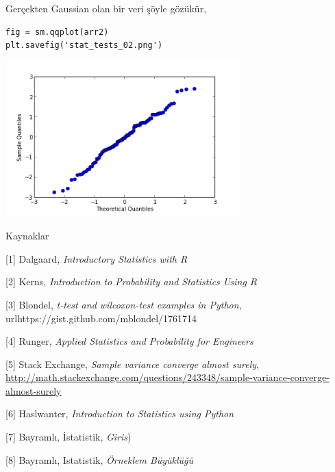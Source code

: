 \documentclass[12pt,fleqn]{article}\usepackage{../../common}
\begin{document}
Gerçekten Gaussian olan bir veri şöyle gözükür, 

\begin{verbatim}
fig = sm.qqplot(arr2)
plt.savefig('stat_tests_02.png')
\end{verbatim}
\includegraphics[height=6cm]{stat_tests_02.png}

Kaynaklar

[1] Dalgaard, {\em Introductory Statistics with R}

[2] Kerns, {\em Introduction to Probability and Statistics Using R}

[3] Blondel, {\em t-test and wilcoxon-test examples in Python}, url{https://gist.github.com/mblondel/1761714}

[4] Runger, {\em Applied Statistics and Probability for Engineers}

[5] Stack Exchange, {\em Sample variance converge almost surely}, \url{http://math.stackexchange.com/questions/243348/sample-variance-converge-almost-surely}

[6] Haslwanter, {\em Introduction to Statistics using Python}

[7] Bayramlı, İstatistik, {\em Giris})

[8] Bayramlı, Istatistik, {\em Örneklem Büyüklüğü}
\end{document}

